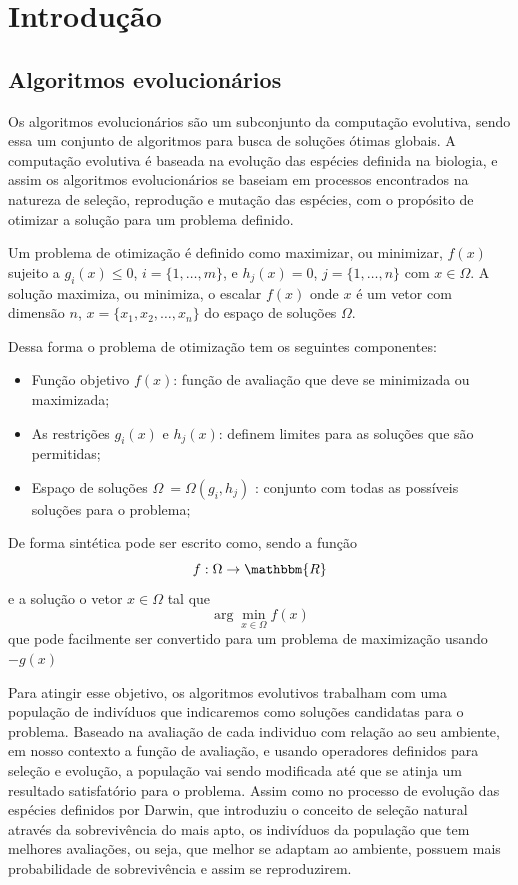 %
\chapter{Introdução}
\label{chap:introducao}

\section{Algoritmos evolucionários}

Os algoritmos evolucionários são um subconjunto da computação evolutiva, sendo essa um conjunto de algoritmos para busca de soluções ótimas globais. A computação evolutiva é baseada na evolução das espécies definida na biologia, e assim os algoritmos evolucionários se baseiam em processos encontrados na natureza de seleção, reprodução e mutação das espécies, com o propósito de otimizar a solução para um problema definido.

Um problema de otimização é definido como maximizar, ou minimizar, $f(x)$ sujeito a \(g_i(x) \leq 0\), \(i = \{1,\ldots, m\}\), e \(h_j(x) = 0\), \(j=\{1,\ldots,n\}\) com \(x \in \Omega \). A solução maximiza, ou minimiza, o escalar \(f(x)\) onde \(x\) é um vetor com dimensão \(n\), \(x=\{x_1,x_2,\ldots,x_n\}\) do espaço de soluções \(\Omega\). \cite{Coello2007} 

Dessa forma o problema de otimização tem os seguintes componentes:
\begin{itemize}
	\item Função objetivo \(f(x)\): função de avaliação que deve se minimizada ou maximizada;
	\item As restrições \(g_i(x)\) e \(h_j(x)\): definem limites para as soluções que são permitidas;
	\item Espaço de soluções \(\Omega\ = \Omega(g_i,h_j)\) : conjunto com todas as possíveis soluções para o problema; 
\end{itemize}

De forma sintética pode ser escrito como, sendo a função \[ f: \Omega \to \mathbbm{R}\] e a solução o vetor \(x \in \Omega\) tal que \[ \arg \min \limits_{x \in \Omega} f(x)\] que pode facilmente ser convertido para um problema de maximização usando \(-g(x)\)

Para atingir esse objetivo, os algoritmos evolutivos trabalham com uma população de indivíduos que indicaremos como soluções candidatas para o problema. Baseado na avaliação de cada individuo com relação ao seu ambiente, em nosso contexto a função de avaliação, e usando operadores definidos para seleção e evolução, a população vai sendo modificada até que se atinja um resultado satisfatório para o problema. Assim como no processo de evolução das espécies definidos por Darwin, que introduziu o conceito de seleção natural  através da sobrevivência do mais apto, os indivíduos da população que tem melhores avaliações, ou seja, que melhor se adaptam ao ambiente, possuem mais probabilidade de sobrevivência e assim se reproduzirem. 

